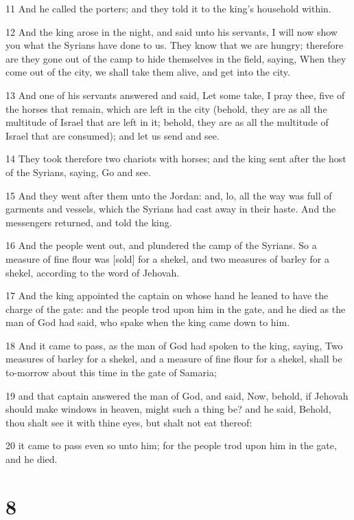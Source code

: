 \par 11 And he called the porters; and they told it to the king's household within.
\par 12 And the king arose in the night, and said unto his servants, I will now show you what the Syrians have done to us. They know that we are hungry; therefore are they gone out of the camp to hide themselves in the field, saying, When they come out of the city, we shall take them alive, and get into the city.
\par 13 And one of his servants answered and said, Let some take, I pray thee, five of the horses that remain, which are left in the city (behold, they are as all the multitude of Israel that are left in it; behold, they are as all the multitude of Israel that are consumed); and let us send and see.
\par 14 They took therefore two chariots with horses; and the king sent after the host of the Syrians, saying, Go and see.
\par 15 And they went after them unto the Jordan: and, lo, all the way was full of garments and vessels, which the Syrians had cast away in their haste. And the messengers returned, and told the king.
\par 16 And the people went out, and plundered the camp of the Syrians. So a measure of fine flour was [sold] for a shekel, and two measures of barley for a shekel, according to the word of Jehovah.
\par 17 And the king appointed the captain on whose hand he leaned to have the charge of the gate: and the people trod upon him in the gate, and he died as the man of God had said, who spake when the king came down to him.
\par 18 And it came to pass, as the man of God had spoken to the king, saying, Two measures of barley for a shekel, and a measure of fine flour for a shekel, shall be to-morrow about this time in the gate of Samaria;
\par 19 and that captain answered the man of God, and said, Now, behold, if Jehovah should make windows in heaven, might such a thing be? and he said, Behold, thou shalt see it with thine eyes, but shalt not eat thereof:
\par 20 it came to pass even so unto him; for the people trod upon him in the gate, and he died.

\chapter{8}

